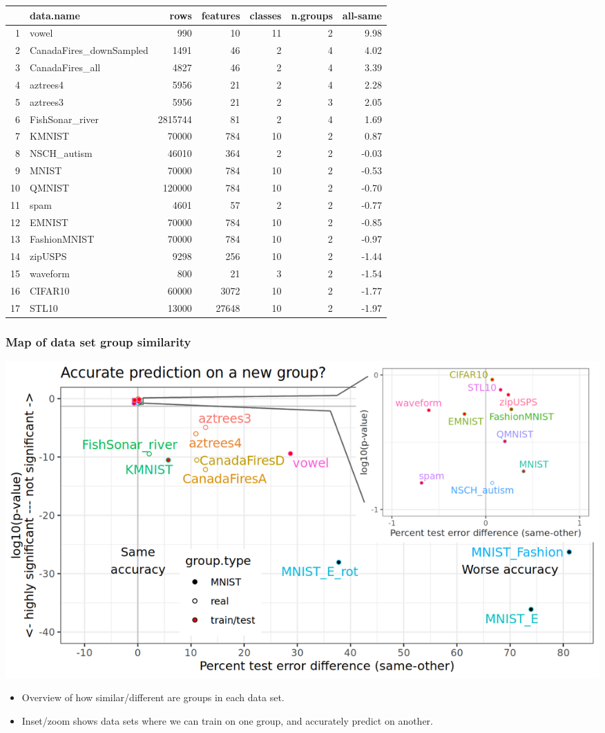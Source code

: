 \documentclass{beamer}
\begin{document}
\begin{frame}
\begin{tabular}{rlrrrrr}
  \hline
 & data.name & rows & features & classes & n.groups & all-same \\ 
  \hline
1 & vowel & 990 &  10 &  11 &   2 & 9.98 \\ 
  2 & CanadaFires\_downSampled & 1491 &  46 &   2 &   4 & 4.02 \\ 
  3 & CanadaFires\_all & 4827 &  46 &   2 &   4 & 3.39 \\ 
  4 & aztrees4 & 5956 &  21 &   2 &   4 & 2.28 \\ 
  5 & aztrees3 & 5956 &  21 &   2 &   3 & 2.05 \\ 
  6 & FishSonar\_river & 2815744 &  81 &   2 &   4 & 1.69 \\ 
  7 & KMNIST & 70000 & 784 &  10 &   2 & 0.87 \\
  \hline
  8 & NSCH\_autism & 46010 & 364 &   2 &   2 & -0.03 \\ 
  9 & MNIST & 70000 & 784 &  10 &   2 & -0.53 \\ 
  10 & QMNIST & 120000 & 784 &  10 &   2 & -0.70 \\ 
  11 & spam & 4601 &  57 &   2 &   2 & -0.77 \\ 
  12 & EMNIST & 70000 & 784 &  10 &   2 & -0.85 \\ 
  13 & FashionMNIST & 70000 & 784 &  10 &   2 & -0.97 \\ 
  14 & zipUSPS & 9298 & 256 &  10 &   2 & -1.44 \\ 
  15 & waveform & 800 &  21 &   3 &   2 & -1.54 \\ 
  16 & CIFAR10 & 60000 & 3072 &  10 &   2 & -1.77 \\ 
  17 & STL10 & 13000 & 27648 &  10 &   2 & -1.97 \\ 
   \hline
\end{tabular}

\end{frame}

\begin{frame}
  \frametitle{Map of data set group similarity}
  \includegraphics[width=\textwidth]{data_Classif_batchmark_registry_scatter_other_zoom_inset.png}
  \begin{itemize}
  \item Overview of how similar/different are groups in each data set. 
  \item Inset/zoom shows data sets where we can train on one group,
    and accurately predict on another.
  \end{itemize}
\end{frame}
\end{document}
